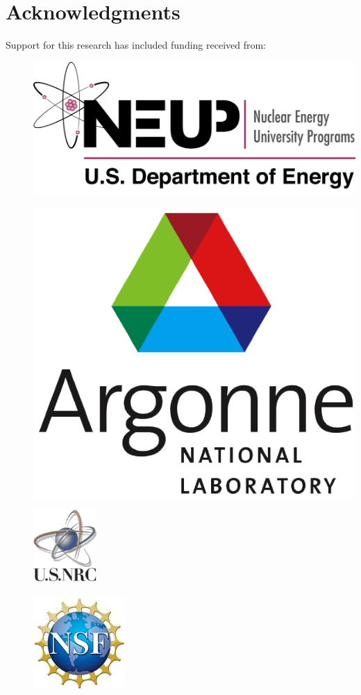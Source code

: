 \documentclass[letterpaper,10pt,english]{sphinxmanual}
\begin{document}
\chapter{Acknowledgments}
\label{index:acknowledgments}\begin{description}
\item[{Support for this research has included funding received from:}] \leavevmode
\includegraphics{neup_logo_large.jpg}

\includegraphics{AnlLogo.png}

\includegraphics{USNRC.gif}

\includegraphics{nsf_logo.jpg}


\end{description}
\end{document}
